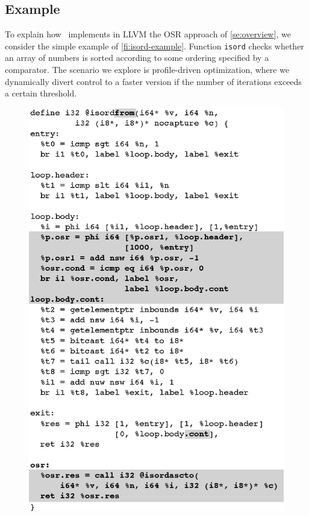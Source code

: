 \subsection{Example}
To explain how \tinyvm\ implements in LLVM the OSR approach of \mysection\ref{se:overview}, we consider the simple example of \myfigure\ref{fi:isord-example}. Function {\tt isord} checks whether an array of numbers is sorted according to some ordering specified by a comparator. The scenario we explore is profile-driven optimization, where we dynamically divert control to a faster version if the number of iterations exceeds a certain threshold. 

\ifdefined\noauthorea
\begin{figure}[t]
\begin{center}
\includegraphics[width=0.9\columnwidth]{figures/isordfrom/isordfrom.eps}
\caption{\protect}
\end{center}
\end{figure}
\fi

